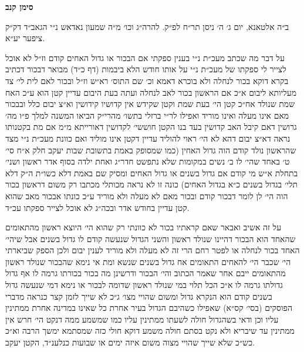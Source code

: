 \documentclass[12pt, openany]{book}
\newcommand{\chapname}{}
\newcommand{\newchap}[1]{
	\addcontentsline{toc}{chapter}{#1}
	\renewcommand{\chapname}{#1}
		\begin{center}
			\textbf{%
\fontsize{16pt}{16pt}\selectfont
				#1}
		\end{center}
}
\begin{document}
\newchap{סימן קנב}
\begin{multicols}{2}
ב״ה אלטאנא, יום ג׳ ה׳ ניסן תר״ח לפ״ק. להרה״ג וכו׳ מ״ה שמעון נאדאש נ״י הגאב״ד דק״ק ציפער יע״א.\\\vspace{0pt}

על דבר מה שכתב מעכ״ת נ״י בענין ספקתי אם הבכור או גדול האחים קודם וז״ל לא אוכל לצייר לי ספקתו של מעכ״ת נ״י על אותו חודש הלא ביבמות (דף כ״ד) מבואר דבכור דכתיב בקרא דוקא בכור לנחלה ולא בוכרא דאמא וכ׳ שם התוס׳ רא״ש וז״ל ובכור לאם לית לי׳ צד מעליותא ליבום א״כ אם הראשון בכור לאב לנחלה ועתה בעת היבום עדיין קטן הוא ע״כ האח שמת שנולד אח״כ קטן הי׳ בעת שמת וקטן שקידש אין קדושיו קידושין וא״צ יבום כלל ובבכור מאם אינו מעלה ואינו מוריד ואפילו לר״י ברזלי בתשו׳ מהרי״ק הביאו המשנה למלך פ״ו מה׳ גרושין דאם קיבל האב קדושין בעד בנו הקטן חוששי׳ לקדושין דאורייתא מ״מ אם מת בקטנותו נראה דא״צ יבום דהא לא הי׳ ראוי להוליד עדיין דקטן אינו מוליד ואם כוונת מעכ״ת נ״י מצד שהראשון נולד קודם הוה גדול האחין (כמו שמסופק באמת בתשובת שבות יעקב חלק א״ח סי׳ ט׳ באחד שהי׳ לו ב׳ נשים במקומות שלא נתפשט חדר״ג ואחת ילדה בסוף אדר ראשון ושני׳ בתחלת א״ש מי קודם אם גדול בשנים או גדול האחים ומסיק שם באמת דלא כשו״ת ה״ק דלא תלי׳ בגדול בשנים כ״א בגדול האחים) כונה זו לא נראה מכותלי מכתבו רק משום דראשון בכור הוה הי׳ לן לומר דבכור קודם ובכור מאם לא מעלה ולא מוריד ע״כ כונתו אבכור מאב שהוא קטן עדיין בחודש אדר ובכה״ג לא אוכל לצייר ספקתו עכ״ד.\\\vspace{0pt}

על זה אשיב ואבאר שאם קראתיו בכור לא כוונתי רק שהוא הי׳ היוצא ראשון מהתאומים שהאחד הוא הבכור דהיינו שנולד ראשון והשני הגדול שנעשה קודם לו גדול בשנים אבל שיהי׳ האחד בכור לנחלה או לפטר רחם הרי זה לא מעלה ולא מוריד לענין יבום ולכן הספק שביארתי הי׳ שכבר הי׳ להאחים התאומים אח גדול בשנים שנשא ומת אי נימא שהבכור שנולד ראשון מהתאומים ייבם אחר שאמר הכתוב והי׳ הבכור ודרשינן מה בכור בכורתו גרמה לו אף גדול גדולתו גרמה לו א״כ הכל תלוי במי שנולד ראשון שדומה לבכור או נימא דמי שנעשה גדול בשנים קודם הוא הנקרא גדול ומשום שהויי מצו׳ ג״כ לא שייך לזמן קצר כנראה מדברי הפוסקים (בסי׳ קס״א) שאפילו כשהיבם הגדול בעיר אחרת כל שאינו במדינה אחרת ממתינין עליו וכן ודאי בשהגדול חולה לשעתו ממתינין עליו כמו שמשמע ממה דנקט הי׳ חרש אין ממתינין עד שיבריא ולא נקט בסתם חולה משמע דוקא חולי כזה שמסתמא ימשך הרבה וא״כ כש״כ שלא שייך שהויי מצוה משום איזה ימים או שבועות כנלענ״ד, הקטן יעקב.\\\vspace{0pt}

\end{multicols}\newpage
\end{document}
